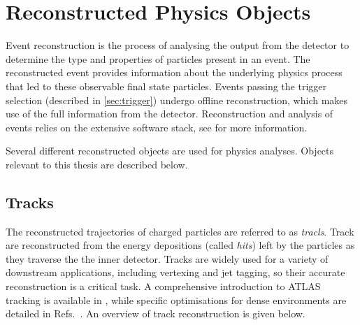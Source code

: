 









\section{Reconstructed Physics Objects}\label{sec:physics-objects}

Event reconstruction is the process of analysing the output from the detector to determine the type and properties of particles present in an event. 
The reconstructed event provides information about the underlying physics process that led to these observable final state particles.
Events passing the trigger selection (described in \cref{sec:trigger}) undergo offline reconstruction, which makes use of the full information from the detector.
Reconstruction and analysis of events relies on the extensive \ATLAS software stack, see  for more information.

Several different reconstructed objects are used for physics analyses.
Objects relevant to this thesis are described below.



\subsection{Tracks}\label{sec:track_reco}
The reconstructed trajectories of charged particles are referred to as \textit{tracls}.
Track are reconstructed from the energy depositions (called \textit{hits}) left by the particles as they traverse the the inner detector.
Tracks are widely used for a variety of downstream applications, including vertexing and jet tagging, so their accurate reconstruction is a critical task.
A comprehensive introduction to ATLAS tracking is available in , while specific optimisations for dense environments are detailed in Refs.~\cite{ATL-PHYS-PUB-2015-006, PERF-2015-08}.
An overview of track reconstruction is given below.

